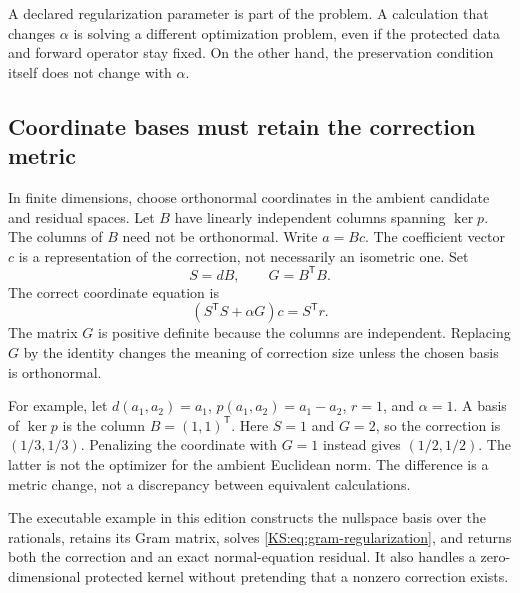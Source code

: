 A declared regularization parameter is part of the problem. A calculation that changes $\alpha$ is solving a different optimization problem, even if the protected data and forward operator stay fixed. On the other hand, the preservation condition itself does not change with $\alpha$.

\subsection{Coordinate bases must retain the correction metric}
In finite dimensions, choose orthonormal coordinates in the ambient candidate and residual spaces. Let $B$ have linearly independent columns spanning $\ker p$. The columns of $B$ need not be orthonormal. Write $a=Bc$. The coefficient vector $c$ is a representation of the correction, not necessarily an isometric one. Set
\[
 S=dB,\qquad G=B^{\mathsf T}B.
\]
The correct coordinate equation is
\begin{equation}\label{KS:eq:gram-regularization}
 (S^{\mathsf T}S+\alpha G)c=S^{\mathsf T}r.
\end{equation}
The matrix $G$ is positive definite because the columns are independent. Replacing $G$ by the identity changes the meaning of correction size unless the chosen basis is orthonormal.

For example, let $d(a_1,a_2)=a_1$, $p(a_1,a_2)=a_1-a_2$, $r=1$, and $\alpha=1$. A basis of $\ker p$ is the column $B=(1,1)^{\mathsf T}$. Here $S=1$ and $G=2$, so the correction is $(1/3,1/3)$. Penalizing the coordinate with $G=1$ instead gives $(1/2,1/2)$. The latter is not the optimizer for the ambient Euclidean norm. The difference is a metric change, not a discrepancy between equivalent calculations.

The executable example in this edition constructs the nullspace basis over the rationals, retains its Gram matrix, solves \eqref{KS:eq:gram-regularization}, and returns both the correction and an exact normal-equation residual. It also handles a zero-dimensional protected kernel without pretending that a nonzero correction exists.

